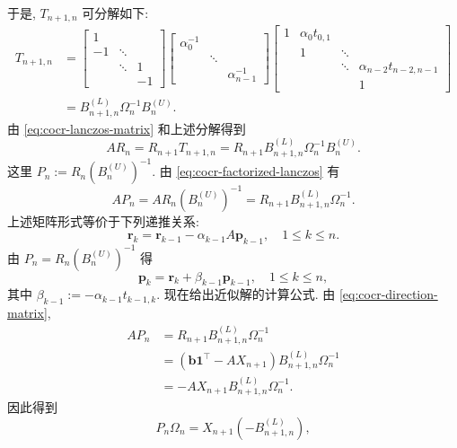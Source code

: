 {于是, $T_{n+1,n}$ 可分解如下:}
\[\begin{aligned}
T_{n+1,n}&=\begin{bmatrix}1&&\\-1&\ddots&\\&\ddots&1\\&&-1\end{bmatrix}
\begin{bmatrix}\alpha_0^{-1}&&\\&\ddots&\\&&\alpha_{n-1}^{-1}\end{bmatrix}
\begin{bmatrix}1&\alpha_0t_{0,1}&&\\&1&\ddots&\\&&\ddots&\alpha_{n-2}t_{n-2,n-1}\\&&&1\end{bmatrix}\\
&=B_{n+1,n}^{(L)}\Omega_n^{-1}B_n^{(U)}.
\end{aligned}\]
{由 \eqref{eq:cocr-lanczos-matrix} 和上述分解得到}
\begin{equation}\label{eq:cocr-factorized-lanczos}
AR_n=R_{n+1}T_{n+1,n}=R_{n+1}B_{n+1,n}^{(L)}\Omega_n^{-1}B_n^{(U)}.
\end{equation}
{这里 $P_n:=R_n(B_n^{(U)})^{-1}$. 由 \eqref{eq:cocr-factorized-lanczos} 有}
\begin{equation}\label{eq:cocr-direction-matrix}
AP_n=AR_n(B_n^{(U)})^{-1}=R_{n+1}B_{n+1,n}^{(L)}\Omega_n^{-1}.
\end{equation}
{上述矩阵形式等价于下列递推关系:}
\begin{equation}\label{eq:cocr-residual-recurrence}\bm r_k=\bm r_{k-1}-\alpha_{k-1}A\bm p_{k-1},\quad1\le k\le n.\end{equation}
{由 $P_n=R_n(B_n^{(U)})^{-1}$ 得}
\begin{equation}\label{eq:cocr-direction-recurrence}\bm p_k=\bm r_k+\beta_{k-1}\bm p_{k-1},\quad1\le k\le n,\end{equation}
{其中 $\beta_{k-1}:=-\alpha_{k-1}t_{k-1,k}$. 现在给出近似解的计算公式. 由 \eqref{eq:cocr-direction-matrix},}
\[\begin{aligned}
AP_n&=R_{n+1}B_{n+1,n}^{(L)}\Omega_n^{-1}\\
&=(\bm b\bm1^{\top}-AX_{n+1})B_{n+1,n}^{(L)}\Omega_n^{-1}\\
&=-AX_{n+1}B_{n+1,n}^{(L)}\Omega_n^{-1}.
\end{aligned}\]
{因此得到}
\[P_n\Omega_n=X_{n+1}(-B_{n+1,n}^{(L)}),\]
